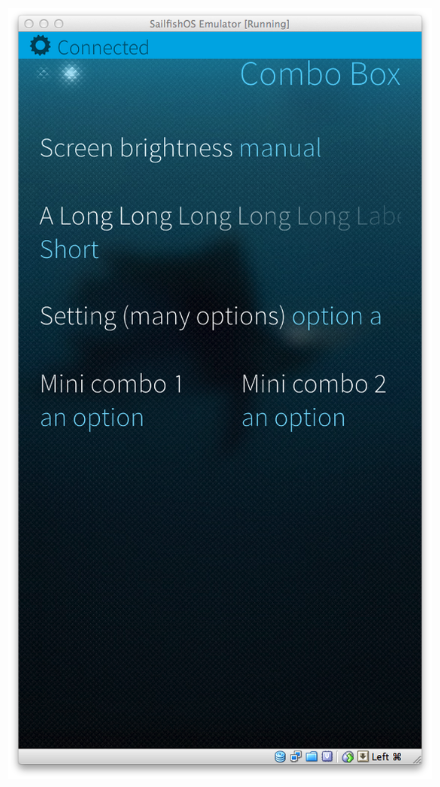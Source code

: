 \begin{figure}[H]
{  \includegraphics[scale=0.3]{../media/gfx/silica/silica04.png}
  \label{fig:silica04}
}
\end{figure}
%
